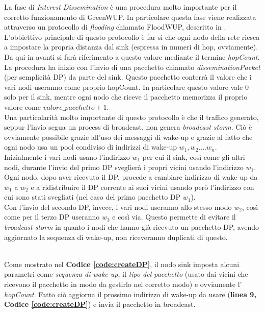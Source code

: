 La fase di \textit{Interest Dissemination} è una procedura molto importante per il corretto funzionamento di GreenWUP. In particolare questa fase viene realizzata attraverso un protocollo di \textit{flooding} chiamato FloodWUP, descritto in \cite{greenWup}. \\

L'obbiettivo principale di questo protocollo è far si che ogni nodo della rete riesca a impostare la propria distanza dal sink (espressa in numeri di hop, ovviamente).\\
Da qui in avanti si farà riferimento a questo valore mediante il termine \textit{hopCount}.\\ 

La procedura ha inizio con l'invio di una pacchetto chiamato \textit{disseminationPacket} (per semplicità DP) da parte del sink. Questo pacchetto conterrà il valore che i vari nodi useranno come proprio hopCount. In particolare questo valore vale 0 solo per il sink, mentre ogni nodo che riceve il pacchetto memorizza il proprio valore come \( valore\_pacchetto + 1 \). \\

Una particolarità molto importante di questo protocollo è che il traffico generato, seppur l'invio segua un process di broadcast, non genera \textit{broadcast storm}. Ciò è ovviamente possibile grazie all'uso dei messaggi di wake-up e grazie al fatto che ogni nodo usa un pool condiviso di indirizzi di wake-up \(w_1, w_2....w_n\).\\
Inizialmente i vari nodi usano l'indirizzo \(w_1\) per cui il sink, così come gli altri nodi, durante l'invio del primo DP sveglierà i propri vicini usando l'indirizzo \(w_1\). Ogni nodo, dopo aver ricevuto il DP, procede a cambiare indirizzo di wake-up da \(w_1\) a \(w_2\) e a ridistribuire il DP corrente ai suoi vicini usando però l'indirizzo con cui sono stati svegliati (nel caso del primo pacchetto DP \(w_1\)).\\

Con l'invio del secondo DP, invece, i vari nodi useranno allo stesso modo \(w_2\), così come per il terzo DP useranno \(w_3\) e così via. Questo permette di evitare il \textit{broadcast storm} in quanto i nodi che hanno già ricevuto un pacchetto DP, avendo aggiornato la sequenza di wake-up, non riceveranno duplicati di questo.

 \\

Come mostrato nel \textbf{Codice \ref{code:createDP}}, il nodo sink imposta alcuni parametri come \textit{sequenza di wake-up}, il \textit{tipo del pacchetto} (usato dai vicini che ricevono il pacchetto in modo da gestirlo nel corretto modo) e ovviamente l' \textit{hopCount}. Fatto ciò aggiorna il prossimo indirizzo di wake-up da usare (\textbf{linea 9, Codice \ref{code:createDP}}) e invia il pacchetto in broadcast. \\

